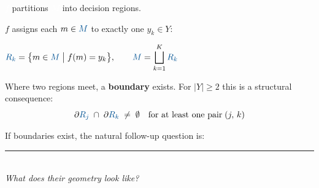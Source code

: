 \documentclass[aspectratio=169, 10pt, t]{beamer}
\newcommand{\tw}[1]{\textcolor{white}{$#1$}}
\newcommand{\Mb}{\textcolor{tumsec}{M}}
\newcommand{\mathstrip}[1]{%
  \par\vspace{4pt}%
  \colorbox{tumbg}{\hspace{0.02\textwidth}\parbox{0.92\textwidth}{\vspace{6pt}%
    \centering #1%
  \vspace{6pt}}}\hspace{0.02\textwidth}%
  \par\vspace{4pt}%
}
\begin{document}
\begin{frame}{\tw{f} partitions \tw{M} into decision regions.}

$f$ assigns each $m \in \Mb$ to exactly one $y_k \in Y$:

\mathstrip{$\displaystyle
  \textcolor{tumsec}{R_k} = \bigl\{m \in \Mb \;\big|\; f(m) = y_k\bigr\}, \qquad \Mb = \bigsqcup_{k=1}^{K} \textcolor{tumsec}{R_k}
$}

\vspace{4pt}
Where two regions meet, a \textbf{boundary} exists.
For $|Y| \geq 2$ this is a structural consequence:
\[
  \partial \textcolor{tumsec}{R_{j}} \;\cap\; \partial \textcolor{tumsec}{R_{k}} \;\neq\; \emptyset \quad \text{for at least one pair}\; (j,\, k)
\]

\vspace{6pt}
If boundaries exist, the natural follow-up question is:

\vspace{2pt}
{\color{tumblue}\rule{0.05\textwidth}{1.5pt}}\\[4pt]
{\large\color{tumblue}\textit{What does their geometry look like?}}

\end{frame}
\end{document}
